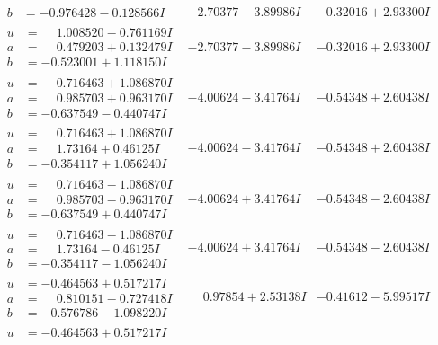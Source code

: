 \documentclass[1p]{elsarticle_modified}
\theoremstyle{definition}
\begin{document}
$$\begin{array}{c|c|c}
\begin{aligned}
b &= -0.976428 - 0.128566 I\end{aligned}
 & -2.70377 - 3.89986 I & -0.32016 + 2.93300 I \\ \hline\begin{aligned}
u &= \phantom{-}1.008520 - 0.761169 I \\
a &= \phantom{-}0.479203 + 0.132479 I \\
b &= -0.523001 + 1.118150 I\end{aligned}
 & -2.70377 - 3.89986 I & -0.32016 + 2.93300 I \\ \hline\begin{aligned}
u &= \phantom{-}0.716463 + 1.086870 I \\
a &= \phantom{-}0.985703 + 0.963170 I \\
b &= -0.637549 - 0.440747 I\end{aligned}
 & -4.00624 - 3.41764 I & -0.54348 + 2.60438 I \\ \hline\begin{aligned}
u &= \phantom{-}0.716463 + 1.086870 I \\
a &= \phantom{-}1.73164 + 0.46125 I \\
b &= -0.354117 + 1.056240 I\end{aligned}
 & -4.00624 - 3.41764 I & -0.54348 + 2.60438 I \\ \hline\begin{aligned}
u &= \phantom{-}0.716463 - 1.086870 I \\
a &= \phantom{-}0.985703 - 0.963170 I \\
b &= -0.637549 + 0.440747 I\end{aligned}
 & -4.00624 + 3.41764 I & -0.54348 - 2.60438 I \\ \hline\begin{aligned}
u &= \phantom{-}0.716463 - 1.086870 I \\
a &= \phantom{-}1.73164 - 0.46125 I \\
b &= -0.354117 - 1.056240 I\end{aligned}
 & -4.00624 + 3.41764 I & -0.54348 - 2.60438 I \\ \hline\begin{aligned}
u &= -0.464563 + 0.517217 I \\
a &= \phantom{-}0.810151 - 0.727418 I \\
b &= -0.576786 - 1.098220 I\end{aligned}
 & \phantom{-}0.97854 + 2.53138 I & -0.41612 - 5.99517 I \\ \hline\begin{aligned}
u &= -0.464563 + 0.517217 I \\

\end{aligned}
\end{array}$$
\end{document}
